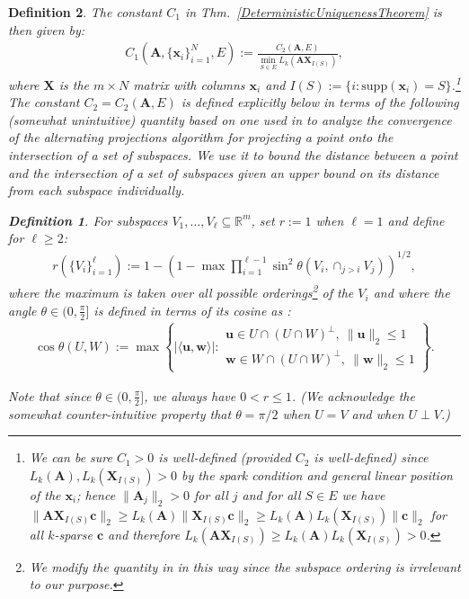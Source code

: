 \documentclass[9pt,twocolumn]{pnas-new}
\newtheorem{definition}{Definition}
\begin{document}
\begin{definition}
The constant $C_1$ in Thm.~\ref{DeterministicUniquenessTheorem} is then given by:
\begin{align}
C_1(\mathbf{A}, \{\mathbf{x}_i\}_{i=1}^N, E) := \frac{ C_2(\mathbf{A}, E) } { \min_{S \in E} L_k(\mathbf{AX}_{I(S)}) },
\end{align}
%
where $\mathbf{X}$ is the $m \times N$ matrix with columns $\mathbf{x}_i$ and $I(S) := \{i : \text{supp}(\mathbf{x}_i) = S\}$.\footnote{We can be sure $C_1 > 0$ is well-defined (provided $C_2$ is well-defined) since $L_k(\mathbf{A}), L_k(\mathbf{X}_{I(S)}) > 0$ by the spark condition and general linear position of the $\mathbf{x}_i$; hence $\|\mathbf{A}_j\|_2 > 0$ for all $j$ and for all $S \in E$ we have $\|\mathbf{AX}_{I(S)}\mathbf{c}\|_2 \geq L_k(\mathbf{A})\|\mathbf{X}_{I(S)}\mathbf{c}\|_2 \geq L_k(\mathbf{A}) L_k(\mathbf{X}_{I(S)})\|\mathbf{c}\|_2$ for all $k$-sparse $\mathbf{c}$ and therefore $L_k(\mathbf{AX}_{I(S)}) \geq L_k(\mathbf{A}) L_k(\mathbf{X}_{I(S)}) > 0$.} The constant $C_2 = C_2(\mathbf{A}, E)$ is defined explicitly below in terms of the following (somewhat unintuitive) quantity based on one used in \cite{Deutsch12} to analyze the convergence of the alternating projections algorithm for projecting a point onto the intersection of a set of subspaces. We use it to bound the distance between a point and the intersection of a set of subspaces given an upper bound on its distance from each subspace individually.

\begin{definition}\label{SpecialSupportSet}\label{FriedrichsDefinition}
For subspaces $V_1, \ldots, V_\ell \subseteq \mathbb{R}^m$, set $r := 1$ when $\ell = 1$ and define for $\ell \geq 2$:
\begin{align*}
r(\{V_i\}_{i=1}^\ell) := 1 - \left(1 -  \max \prod_{i=1}^{\ell-1} \sin^2  \theta \left(V_i, \cap_{j>i} V_j \right)  \right)^{1/2},
\end{align*} 
%
where the maximum is taken over all possible orderings\footnote{We modify the quantity in \cite{Deutsch12} in this way since the subspace ordering is irrelevant to our purpose.} of the $V_i$ and where the angle $\theta \in (0,\frac{\pi}{2}]$ is defined in terms of its cosine as \cite[Def.~9.4]{Deutsch12}:
\begin{align*}
\cos{\theta(U,W)} := \max\left\{ |\langle \mathbf{u}, \mathbf{w} \rangle|: \substack{ \mathbf{u} \in U \cap (U \cap W)^\perp, \ \|\mathbf{u}\|_2 \leq 1 \\ \mathbf{w} \in W \cap (U \cap W)^\perp, \  \|\mathbf{w}\|_2 \leq 1 } \right\}.
\end{align*}
\end{definition}
Note that since $\theta \in (0,\frac{\pi}{2}]$, we always have $0 < r \leq 1$. (We acknowledge the somewhat counter-intuitive property that $\theta =  \pi/2$ when $U = V$ and when $U \perp V$.)  %


\end{definition}
\end{document}
